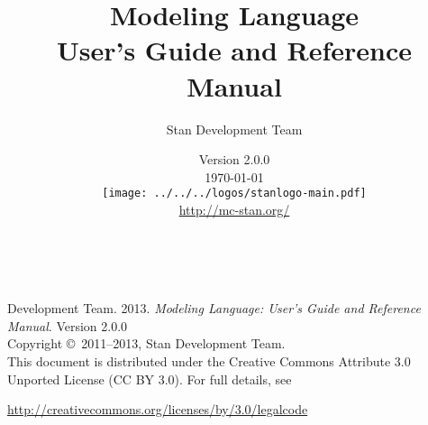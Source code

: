 \title{\Huge\bf \Stan Modeling Language \\[4pt] {\LARGE User's Guide
    and Reference Manual}}
\author{Stan Development Team}

\date{\vspace*{36pt} \Stan Version
2.0.0
\\[8pt] {\small \today}
\\[36pt]
{
\vfill
\texttt{[image: ../../../logos/stanlogo-main.pdf]}}
\\
\vspace*{6pt}
{\small \url{http://mc-stan.org/}}
}
\maketitle

\newpage
\thispagestyle{empty}
\mbox{ }
\vfill
\begin{center}
\begin{minipage}[t]{0.75\textwidth}
\small
\Stan Development Team. 2013.  
{\it \Stan Modeling Language: User's Guide and Reference Manual}. Version
2.0.0
\vspace*{20pt}
\mbox{ }
\\
Copyright \copyright \ 2011--2013, Stan Development Team.
\vspace*{28pt}
\mbox{} \\
This document is distributed under the Creative Commons Attribute 3.0
Unported License (CC BY 3.0).  For full details, see
\begin{center}
\url{http://creativecommons.org/licenses/by/3.0/legalcode} 
\end{center}
\end{minipage}
\vspace*{24pt}
\mbox{ }
\end{center}

